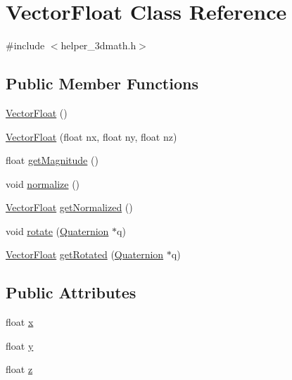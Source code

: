 \hypertarget{classVectorFloat}{}\section{Vector\+Float Class Reference}
\label{classVectorFloat}


{\ttfamily \#include $<$helper\+\_\+3dmath.\+h$>$}

\subsection*{Public Member Functions}
\begin{DoxyCompactItemize}
\item 
\mbox{\hyperlink{classVectorFloat_a8b54ec5c117ca7101cff478b3cfaa0cc}{Vector\+Float}} ()
\item 
\mbox{\hyperlink{classVectorFloat_a3b12ed03e28bded4316275882433e5aa}{Vector\+Float}} (float nx, float ny, float nz)
\item 
float \mbox{\hyperlink{classVectorFloat_abe0c3954d8da8829a053125df1ce63d5}{get\+Magnitude}} ()
\item 
void \mbox{\hyperlink{classVectorFloat_a112eaf8758a6f51b96ed1ccb71700495}{normalize}} ()
\item 
\mbox{\hyperlink{classVectorFloat}{Vector\+Float}} \mbox{\hyperlink{classVectorFloat_aacb5e7ca59563c47dd066d8b1264ec4b}{get\+Normalized}} ()
\item 
void \mbox{\hyperlink{classVectorFloat_afef0e6d631fb1eb67b6913e90730aa9e}{rotate}} (\mbox{\hyperlink{classQuaternion}{Quaternion}} $\ast$q)
\item 
\mbox{\hyperlink{classVectorFloat}{Vector\+Float}} \mbox{\hyperlink{classVectorFloat_ab4093d50e98baf0d98b437a2b3ee7c2e}{get\+Rotated}} (\mbox{\hyperlink{classQuaternion}{Quaternion}} $\ast$q)
\end{DoxyCompactItemize}
\subsection*{Public Attributes}
\begin{DoxyCompactItemize}
\item 
float \mbox{\hyperlink{classVectorFloat_a2d8e5159f045ca977769d168af75320c}{x}}
\item 
float \mbox{\hyperlink{classVectorFloat_a4affe2a9de97600b3d8df98586679e14}{y}}
\item 
float \mbox{\hyperlink{classVectorFloat_a54b8e4234e3b48e106d090570755f107}{z}}
\end{DoxyCompactItemize}


